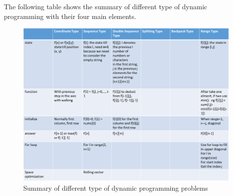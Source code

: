 \documentclass[../main.tex]{subfiles}
\begin{document}
The following table shows the summary of different type of dynamic programming with their four main elements. 
\begin{figure}[h]
    \centering
    \includegraphics[width = 0.98\columnwidth]{fig/summary_dp.png}
    \caption{Summary of different type of dynamic programming problems}
    \label{fig:dp_summary}
\end{figure}

\end{document}
